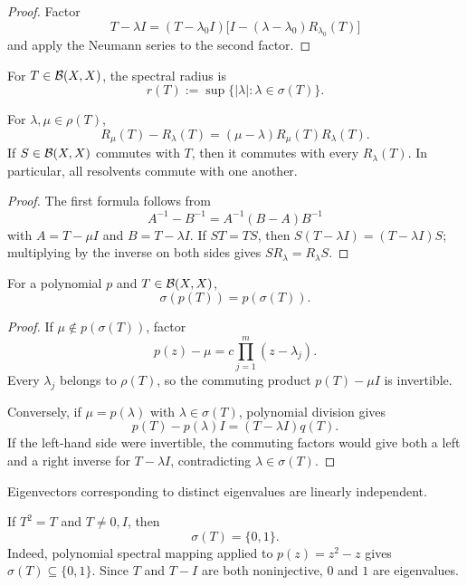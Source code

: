 \begin{proof}
Factor
\[
  T-\lambda I
  =(T-\lambda_0I)
   \bigl[I-(\lambda-\lambda_0)R_{\lambda_0}(T)\bigr]
\]
and apply the Neumann series to the second factor.
\end{proof}

\begin{notedefinition}
For $T\in\mathcal{B}(X,X)$, the spectral radius is
\[
  r(T):=\sup\{ |\lambda|:\lambda\in\sigma(T)\}.
\]
\end{notedefinition}

\begin{notetheorem}
For $\lambda,\mu\in\rho(T)$,
\[
  R_\mu(T)-R_\lambda(T)
  =(\mu-\lambda)R_\mu(T)R_\lambda(T).
\]
If $S\in\mathcal{B}(X,X)$ commutes with $T$, then it commutes with every
$R_\lambda(T)$.  In particular, all resolvents commute with one another.
\end{notetheorem}

\begin{proof}
The first formula follows from
\[
  A^{-1}-B^{-1}=A^{-1}(B-A)B^{-1}
\]
with $A=T-\mu I$ and $B=T-\lambda I$.  If $ST=TS$, then
$S(T-\lambda I)=(T-\lambda I)S$; multiplying by the inverse on both sides
gives $SR_\lambda=R_\lambda S$.
\end{proof}

\begin{notetheorem}
For a polynomial $p$ and $T\in\mathcal{B}(X,X)$,
\[
  \sigma(p(T))=p(\sigma(T)).
\]
\end{notetheorem}

\begin{proof}
If $\mu\notin p(\sigma(T))$, factor
\[
  p(z)-\mu=c\prod_{j=1}^{m}(z-\lambda_j).
\]
Every $\lambda_j$ belongs to $\rho(T)$, so the commuting product
$p(T)-\mu I$ is invertible.

Conversely, if $\mu=p(\lambda)$ with $\lambda\in\sigma(T)$, polynomial
division gives
\[
  p(T)-p(\lambda)I=(T-\lambda I)q(T).
\]
If the left-hand side were invertible, the commuting factors would give both
a left and a right inverse for $T-\lambda I$, contradicting
$\lambda\in\sigma(T)$.
\end{proof}

\begin{notelemma}
Eigenvectors corresponding to distinct eigenvalues are linearly independent.
\end{notelemma}

\begin{noteexample}
If $T^2=T$ and $T\ne0,I$, then
\[
  \sigma(T)=\{0,1\}.
\]
Indeed, polynomial spectral mapping applied to $p(z)=z^2-z$ gives
$\sigma(T)\subseteq\{0,1\}$.  Since $T$ and $T-I$ are both noninjective,
$0$ and $1$ are eigenvalues.
\end{noteexample}


